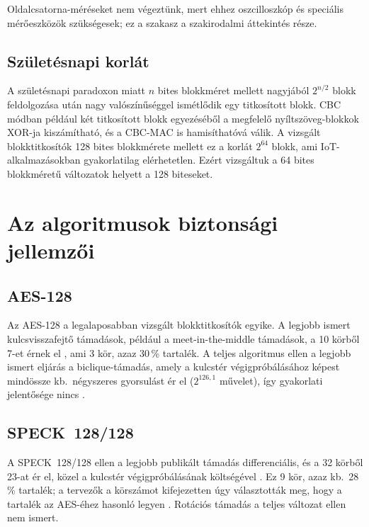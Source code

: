\documentclass[a4paper,12pt]{report}
\theoremstyle{definition}
\theoremstyle{remark}
\begin{document}
Oldalcsatorna-méréseket nem végeztünk, mert ehhez oszcilloszkóp és speciális mérőeszközök szükségesek; ez a szakasz a szakirodalmi áttekintés része.

\subsection{Születésnapi korlát}\label{sec:birthday}

A születésnapi paradoxon miatt $n$ bites blokkméret mellett nagyjából $2^{n/2}$ blokk feldolgozása után nagy valószínűséggel ismétlődik egy titkosított blokk. CBC módban például két titkosított blokk egyezéséből a megfelelő nyíltszöveg-blokkok XOR-ja kiszámítható, és a CBC-MAC is hamisíthatóvá válik. A vizsgált blokktitkosítók 128 bites blokkmérete mellett ez a korlát $2^{64}$ blokk, ami IoT-alkalmazásokban gyakorlatilag elérhetetlen. Ezért vizsgáltuk a 64 bites blokkméretű változatok helyett a 128 biteseket.

\section{Az algoritmusok biztonsági jellemzői}\label{sec:alg_security}

\subsection{AES-128}

Az AES-128 a legalaposabban vizsgált blokktitkosítók egyike. A legjobb ismert kulcsvisszafejtő támadások, például a meet-in-the-middle támadások, a 10 körből 7-et érnek el \cite{Derbez2013}, ami 3 kör, azaz 30\,\% tartalék. A teljes algoritmus ellen a legjobb ismert eljárás a biclique-támadás, amely a kulcstér végigpróbálásához képest mindössze kb.\ négyszeres gyorsulást ér el ($2^{126{,}1}$ művelet), így gyakorlati jelentősége nincs \cite{Bogdanov2011}.

\subsection{SPECK~128/128}

A SPECK~128/128 ellen a legjobb publikált támadás differenciális, és a 32 körből 23-at ér el, közel a kulcstér végigpróbálásának költségével \cite{Song2016}. Ez 9 kör, azaz kb.\ 28\,\% tartalék; a tervezők a körszámot kifejezetten úgy választották meg, hogy a tartalék az AES-éhez hasonló legyen \cite{Beaulieu2017}. Rotációs támadás a teljes változat ellen nem ismert.
\end{document}
